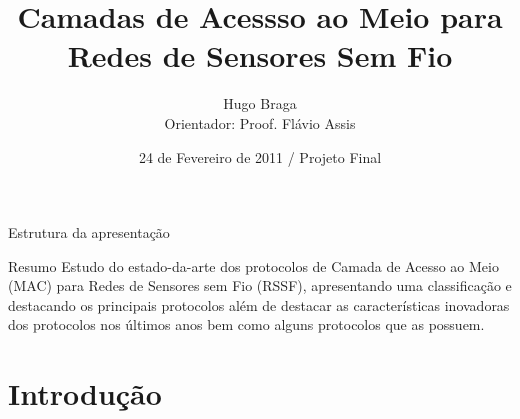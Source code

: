 \documentclass{beamer}
\title[Projeto Final] %
{Camadas de Acessso ao Meio para Redes de Sensores Sem Fio}
\author[hugo] %
{Hugo Braga\\
Orientador: Proof. Flávio Assis
}
\institute[UFBA] %
{
  Especialização Avançada em Sistemas Distribuídos\\
  Universidade Federal da Bahia}
\date[Short Occasion] %
{24 de Fevereiro de 2011 / Projeto Final}
\begin{document}
\begin{frame}
  \titlepage
\end{frame}

\begin{frame}{Estrutura da apresentação}
  \tableofcontents
\end{frame}



\begin{frame}{Resumo}
  Estudo do estado-da-arte dos protocolos de Camada de Acesso ao Meio (MAC) para Redes de Sensores sem Fio (RSSF), apresentando uma classificação e destacando os 
principais protocolos além de destacar as características inovadoras dos protocolos nos últimos anos bem como alguns protocolos que as possuem.
\end{frame}



\section{Introdução}
\end{document}
